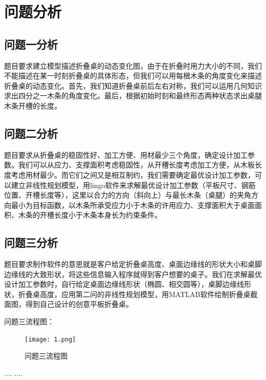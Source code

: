 \documentclass[bwprint]{gmcmthesis}
\begin{document}
\section{问题分析}

\subsection{问题一分析}
题目要求建立模型描述折叠桌的动态变化图，由于在折叠时用力大小的不同，我们不能描述在某一时刻折叠桌的具体形态，但我们可以用每根木条的角度变化来描述折叠桌的动态变化。首先，我们知道折叠桌前后左右对称，我们可以运用几何知识求出四分之一木条的角度变化。最后，根据初始时刻和最终形态两种状态求出桌腿木条开槽的长度。



\subsection{问题二分析}
题目要求从折叠桌的稳固性好、加工方便、用材最少三个角度，确定设计加工参数。我们可以从应力、支撑面积考虑稳固性，从开槽长度考虑加工方便，从木板长度考虑用材最少。而它们之间又是相互制约，我们需要确定最优设计加工参数，可以建立非线性规划模型，用lingo软件来求解最优设计加工参数（平板尺寸、钢筋位置、开槽长度等），这里以合力的方向（斜向上）与最长木条（桌腿）的夹角方向最小为目标函数，以木条所承受应力小于木条的许用应力、支撑面积大于桌面面积、木条的开槽长度小于木条本身长为约束条件。

\subsection{问题三分析}
题目要求制作软件的意思就是客户给定折叠桌高度、桌面边缘线的形状大小和桌脚边缘线的大致形状，将这些信息输入程序就得到客户想要的桌子。我们在求解最优设计加工参数时，自行给定桌面边缘线形状（椭圆、相交圆等），桌脚边缘线形状，折叠桌高度，应用第二问的非线性规划模型，用MATLAB软件绘制折叠桌截面图，得到自己设计的创意平板折叠桌。

问题三流程图：
\begin{figure}[!h]
\centering
\texttt{[image: 1.png]}
\caption{问题三流程图}
\end{figure}

\begin{thebibliography}{9}%
  ....
  ....
\end{thebibliography}

\newpage
\appendix
\end{document}
